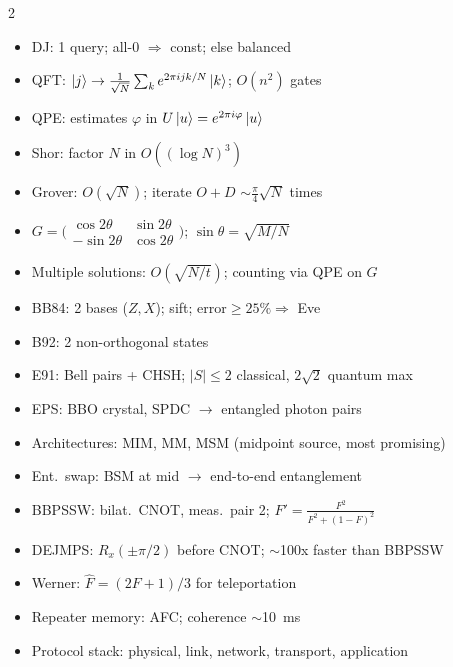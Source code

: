 \documentclass[10pt,a4paper]{article}
\begin{document}
\begin{multicols}{2}
\begin{tcolorbox}[cheatstyle, title={Algorithms}]
\begin{itemize}[nosep,leftmargin=*]
\item DJ: 1 query; all-0 $\Rightarrow$ const; else balanced
\item QFT: $\ket{j}\to\frac{1}{\sqrt{N}}\sum_k e^{2\pi ijk/N}\ket{k}$; $O(n^2)$ gates
\item QPE: estimates $\varphi$ in $U\ket{u}=e^{2\pi i\varphi}\ket{u}$
\item Shor: factor $N$ in $O((\log N)^3)$
\item Grover: $O(\sqrt{N})$; iterate $O+D$ $\sim\frac{\pi}{4}\sqrt{N}$ times
\item $G=\bigl(\begin{smallmatrix}\cos 2\theta&\sin 2\theta\\-\sin 2\theta&\cos 2\theta\end{smallmatrix}\bigr)$; $\sin\theta=\sqrt{M/N}$
\item Multiple solutions: $O(\sqrt{N/t})$; counting via QPE on $G$
\end{itemize}
\end{tcolorbox}

\begin{tcolorbox}[cheatstyle, title={QKD \& Quantum Internet}]
\begin{itemize}[nosep,leftmargin=*]
\item BB84: 2 bases ($Z,X$); sift; error$\ge 25\%\Rightarrow$ Eve
\item B92: 2 non-orthogonal states
\item E91: Bell pairs + CHSH; $|S|\le 2$ classical, $2\sqrt{2}$ quantum max
\item EPS: BBO crystal, SPDC $\to$ entangled photon pairs
\item Architectures: MIM, MM, MSM (midpoint source, most promising)
\item Ent.\ swap: BSM at mid $\to$ end-to-end entanglement
\item BBPSSW: bilat.\ CNOT, meas.\ pair 2; $F'=\frac{F^2}{F^2+(1-F)^2}$
\item DEJMPS: $R_x(\pm\pi/2)$ before CNOT; $\sim$100x faster than BBPSSW
\item Werner: $\hat{F}=(2F+1)/3$ for teleportation
\item Repeater memory: AFC; coherence $\sim$10~ms
\item Protocol stack: physical, link, network, transport, application
\end{itemize}
\end{tcolorbox}

\end{multicols}
\end{document}
